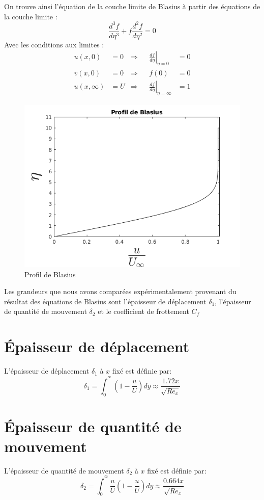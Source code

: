 On trouve ainsi l'équation de la couche limite de Blasius à partir des équations de la couche limite :
\begin{equation}	
	\frac{d^{3}f}{d\eta^{3}} + f\frac{d^{2} f}{d\eta^{2}} = 0
\end{equation}
Avec les conditions aux limites :
\begin{align}
	u(x,0) &= 0 &\Rightarrow &&
	\left.
	\frac{d f}{d \eta}     \right|_{\eta = 0} &= 0
	\\
	v(x,0) &= 0 &\Rightarrow &&
	f(0) &= 0
	\\
	u(x,\infty) &= U &\Rightarrow &&
	\left.
	\frac{d f}{d \eta} \right|_{\eta = \infty} &= 1
\end{align}
\newpage
\begin{figure}[ht]
	\centering
	\includegraphics[scale = 0.6]{./gfx/Blasius.png}
	\caption{Profil de Blasius}
\end{figure}
Les grandeurs que nous avons comparées expérimentalement provenant du résultat des équations de Blasius sont l'épaisseur de déplacement $\delta_{1}$, l'épaisseur de quantité de mouvement $\delta_{2}$ et le coefficient de frottement $C_{f}$
\section{Épaisseur de déplacement}
L'épaisseur de déplacement $\delta_{1}$ à $x$ fixé est définie par:
\begin{equation}
	\delta_{1} = 
	\int_{0}^{^\infty}
	\left(
	1 - 
	\frac{u}{U}
	\right)
	dy
	\approx \frac{1.72x}{\sqrt{Re_{x}}}
\end{equation}
\section{Épaisseur de quantité de mouvement}
L'épaisseur de quantité de mouvement $\delta_{2}$ à $x$ fixé est définie par:
\begin{equation}
	\delta_{2} = 
	\int_{0}^{^\infty}
	\frac{u}{U}
	\left(
	1 - 
	\frac{u}{U}
	\right)
	dy
	\approx \frac{0.664x}{\sqrt{Re_{x}}}
\end{equation}
